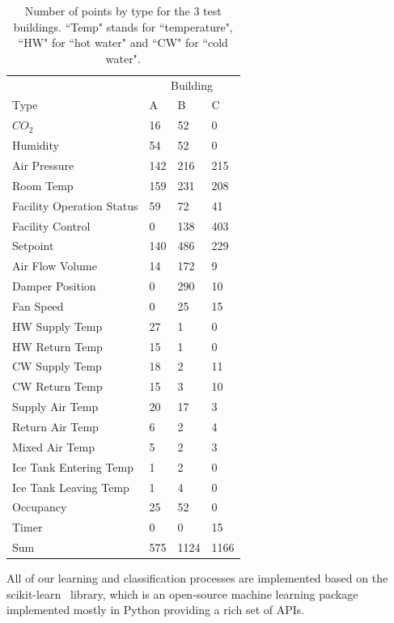 \begin{table}[t]
\centering
\begin{tabular}{l | l l l}
\hline
& \multicolumn{3}{c}{Building} \\
Type & A & B & C\\
\hline\hline
$CO_{2}$ & 16 & 52 & 0\\
Humidity & 54 & 52 & 0\\
Air Pressure & 142 & 216 & 215\\
Room Temp & 159 & 231 & 208\\
Facility Operation Status & 59 & 72 & 41\\
Facility Control & 0 & 138 & 403\\
Setpoint & 140 & 486 & 229\\
Air Flow Volume & 14 & 172 & 9\\
Damper Position & 0 & 290 & 10\\
Fan Speed & 0 & 25 & 15\\
HW Supply Temp & 27 & 1 & 0\\
HW Return Temp & 15 & 1 & 0\\
CW Supply Temp & 18 & 2 & 11\\
CW Return Temp & 15 & 3 & 10\\
Supply Air Temp & 20 & 17 & 3\\
Return Air Temp & 6 & 2 & 4\\
Mixed Air Temp & 5 & 2 & 3\\
Ice Tank Entering Temp & 1 & 2 & 0\\
Ice Tank Leaving Temp & 1 & 4 & 0\\
Occupancy & 25 & 52 & 0\\
Timer & 0 & 0 & 15\\ \hline
Sum & 575 & 1124 & 1166\\ \hline
\end{tabular}
\caption{Number of points by type for the 3 test buildings. ``Temp" stands for ``temperature", ``HW" for ``hot water" and ``CW" for ``cold water".}
\label{table:num}
\end{table}


All of our learning and classification processes are implemented based on the scikit-learn~\cite{scikit} library, which is an open-source machine learning package 
implemented mostly in Python providing a rich set of APIs.

